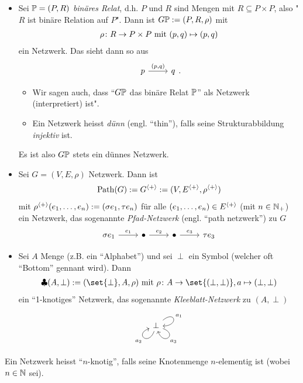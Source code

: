 \begin{example}[Details]
    \begin{itemize}
        \item Sei $\Relat = (P,R)$ \emph{binäres Relat}, d.h. $P$ und $R$ sind Mengen mit $R\subseteq P \times P$, also "$R$ ist binäre Relation auf $P$". Dann ist $G\Relat := (P,R,\rho)$ mit 
        \begin{align*}
            \rho \colon R \to P\times P \mit (p,q) \mapsto (p,q)
        \end{align*}
        ein Netzwerk. Das sieht dann so aus
        $$
            \begin{tikzcd}
                p \arrow[r, "{(p,q)}"] & q
            \end{tikzcd}.
        $$
        \begin{remark}
            \begin{itemize}
                \item Wir sagen auch, dass ``$G\Relat$ das binäre Relat $\Relat$'' als Netzwerk (interpretiert) ist".
                \item Ein Netzwerk heisst \emph{dünn} (engl. ``thin''), falls seine Strukturabbildung \emph{injektiv} ist.
            \end{itemize}
            Es ist also $G\Relat$ stets ein dünnes Netzwerk.
        \end{remark}
        \item Sei $G=(V,E,\rho)$ Netzwerk. Dann ist
        \begin{align*}
            \Path(G) := G^{\Gen{+}} := (V, E^{\Gen{+}}, \rho^{\Gen{+}})
        \end{align*}
        mit $\rho^{\Gen{+}}(e_1, \dots, e_n) := (\sigma e_1, \tau e_n)$ für alle $(e_1, \dots, e_n) \in E^{\Gen{+}}$ (mit $n \in \N_+$) ein Netzwerk, das sogenannte \emph{Pfad-Netzwerk} (engl. ``path netzwerk'') zu $G$
        $$
        \begin{tikzcd}
            \sigma e_1 \arrow[r, "e_1"] & \bullet \arrow[r, "e_2"] & \bullet \arrow[r, "e_3"] & \tau e_3
        \end{tikzcd}
        $$
        \item Sei $A$ Menge (z.B. ein ``Alphabet'') und sei $\perp$ ein Symbol (welcher oft ``Bottom'' gennant wird). Dann 
        \begin{align*}
            \cloverleaf(A, \perp) := (\set{\perp}, A, \rho) \mit \rho \colon A \to \set{(\perp, \perp)}, a \mapsto (\perp, \perp)
        \end{align*}
        ein ``1-knotiges'' Netzwerk, das sogenannte \emph{Kleeblatt-Netzwerk} zu $(A,\perp)$ 
        $$
        \begin{tikzcd}
            \perp \arrow["a_1", loop, distance=2em, in=0, out=40] \arrow["a_3",loop, distance=2em, in=290, out=340] \arrow["a_2",loop, distance=2em, in=200, out=250]
        \end{tikzcd}
        $$
    \end{itemize}
\end{example}
\begin{remark}
    Ein Netzwerk heisst ``$n$-knotig'', falls seine Knotenmenge $n$-elementig ist (wobei $n \in \N$ sei).
\end{remark}
